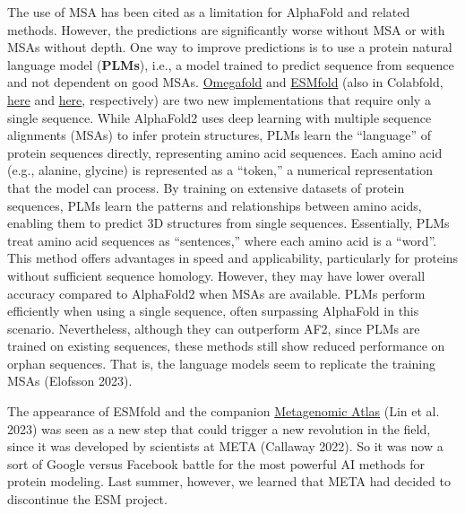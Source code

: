 \documentclass[
]{scrbook}
\begin{document}
The use of MSA has been cited as a limitation for AlphaFold and related
methods. However, the predictions are significantly worse without MSA or
with MSAs without depth. One way to improve predictions is to use a
protein natural language model (\textbf{PLMs}), i.e., a model trained to
predict sequence from sequence and not dependent on good MSAs.
\href{https://github.com/HeliXonProtein/OmegaFold}{Omegafold} and
\href{https://esmatlas.com/resources?action=fold}{ESMfold} (also in
Colabfold,
\href{https://colab.research.google.com/github/sokrypton/ColabFold/blob/main/beta/omegafold.ipynb}{here}
and
\href{https://colab.research.google.com/github/sokrypton/ColabFold/blob/main/ESMFold.ipynb}{here},
respectively) are two new implementations that require only a single
sequence. While AlphaFold2 uses deep learning with multiple sequence
alignments (MSAs) to infer protein structures, PLMs learn the
``language'' of protein sequences directly, representing amino acid
sequences. Each amino acid (e.g., alanine, glycine) is represented as a
``token,'' a numerical representation that the model can process. By
training on extensive datasets of protein sequences, PLMs learn the
patterns and relationships between amino acids, enabling them to predict
3D structures from single sequences. Essentially, PLMs treat amino acid
sequences as ``sentences,'' where each amino acid is a ``word''. This
method offers advantages in speed and applicability, particularly for
proteins without sufficient sequence homology. However, they may have
lower overall accuracy compared to AlphaFold2 when MSAs are available.
PLMs perform efficiently when using a single sequence, often surpassing
AlphaFold in this scenario. Nevertheless, although they can outperform
AF2, since PLMs are trained on existing sequences, these methods still
show reduced performance on orphan sequences. That is, the language
models seem to replicate the training MSAs (Elofsson 2023).

The appearance of ESMfold and the companion
\href{https://esmatlas.com/}{Metagenomic Atlas} (Lin et al. 2023) was
seen as a new step that could trigger a new revolution in the field,
since it was developed by scientists at META (Callaway 2022). So it was
now a sort of Google versus Facebook battle for the most powerful AI
methods for protein modeling. Last summer, however, we learned that META
had decided to discontinue the ESM project.

\begin{centering}\begin{tcolorbox}[hbox,
colframe=lightgray,
colback=white]

\textcolor{ProcessBlue}{{\Large {\faTwitterSquare}}} %

\href{https://twitter.com/KevinKaichuang/status/1689071501998260224}{}

\end{tcolorbox}\end{centering}
\vspace{1em}
\end{document}
